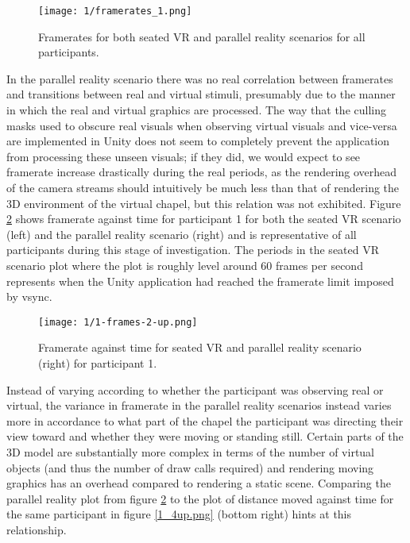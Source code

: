 \begin{figure}[ht]
	\begin{center}
		\texttt{[image: 1/framerates\_1.png]}
		\caption{Framerates for both seated VR and parallel reality scenarios for all participants.}
		\label{framerates_1.png}
	\end{center}
\end{figure}

In the parallel reality scenario there was no real correlation between framerates and transitions between real and virtual stimuli, presumably due to the manner in which the real and virtual graphics are processed. The way that the culling masks used to obscure real visuals when observing virtual visuals and vice-versa are implemented in Unity does not seem to completely prevent the application from processing these unseen visuals; if they did, we would expect to see framerate increase drastically during the real periods, as the rendering overhead of the camera streams should intuitively be much less than that of rendering the 3D environment of the virtual chapel, but this relation was not exhibited. Figure \ref{1-frames-2-up.png} shows framerate against time for participant 1 for both the seated VR scenario (left) and the parallel reality scenario (right) and is representative of all participants during this stage of investigation. The periods in the seated VR scenario plot where the plot is roughly level around 60 frames per second represents when the Unity application had reached the framerate limit imposed by vsync.

\begin{figure}[ht]
	\begin{center}
		\texttt{[image: 1/1-frames-2-up.png]}
		\caption{Framerate against time for seated VR and parallel reality scenario (right) for participant 1.}
		\label{1-frames-2-up.png}
	\end{center}
\end{figure}

Instead of varying according to whether the participant was observing real or virtual, the variance in framerate in the parallel reality scenarios instead varies more in accordance to what part of the chapel the participant was directing their view toward and whether they were moving or standing still. Certain parts of the 3D model are substantially more complex in terms of the number of virtual objects (and thus the number of draw calls required) and rendering moving graphics has an overhead compared to rendering a static scene. Comparing the parallel reality plot from figure \ref{1-frames-2-up.png} to the plot of distance moved against time for the same participant in figure \ref{1_4up.png} (bottom right) hints at this relationship.

